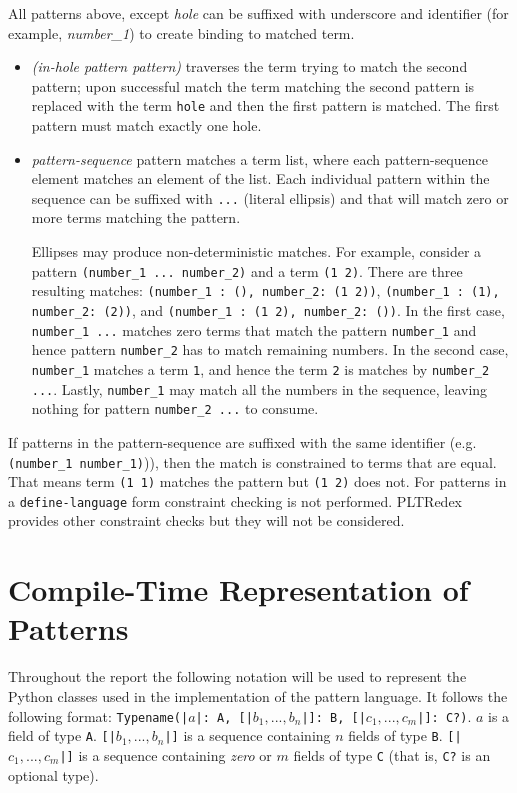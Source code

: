 All patterns above, except \textit{hole} can be suffixed with underscore and identifier (for example, \textit{number\_1}) to create binding to matched term.

\begin{itemize}
\item
\textit{(in-hole pattern pattern)} traverses the term trying to match the second pattern; upon successful match the term matching the second pattern is replaced with the term \texttt{hole} and then the first pattern is matched. The first pattern must match exactly one hole.

\item
\textit{pattern-sequence} pattern matches a term list, where each pattern-sequence element matches an element of the list. Each individual pattern within the sequence can be suffixed with \texttt{...} (literal ellipsis) and that will match zero or more terms matching the pattern.

Ellipses may produce non-deterministic matches. For example, consider a pattern \texttt{(number\_1 ... number\_2)} and a term \texttt{(1 2)}. There are three resulting matches: \texttt{(number\_1 : (), number\_2: (1 2))}, \texttt{(number\_1 : (1), number\_2: (2))}, and \texttt{(number\_1 : (1 2), number\_2: ())}. In the first case, \texttt{number\_1 ...} matches zero terms that match the pattern \texttt{number\_1} and hence pattern \texttt{number\_2} has to match remaining numbers. In the second case, \texttt{number\_1} matches a term \texttt{1}, and hence the term \texttt{2} is matches by \texttt{number\_2 ...}. Lastly, \texttt{number\_1} may match all the numbers in the sequence, leaving nothing for pattern \texttt{number\_2 ...} to consume.
\end{itemize}

If patterns in the pattern-sequence are suffixed with the same identifier (e.g. \texttt{(number\_1 number\_1)})), then the match is constrained to terms that are equal. That means term \texttt{(1 1)} matches the pattern but \texttt{(1 2)} does not. For patterns in a \texttt{define-language} form constraint checking is not performed. PLTRedex provides other constraint checks but they will not be considered.

\section{Compile-Time Representation of Patterns}

Throughout the report the following notation will be used to represent the Python classes used in the implementation of the pattern language. It follows the following format: \texttt{Typename(|$a$|: A, [|$b_1,...,b_n$|]: B, [|$c_1,...,c_m$|]: C?)}. $a$ is a field of type \texttt{A}. \texttt{[|$b_1,...,b_n$|]} is a sequence containing $n$ fields of type \texttt{B}. \texttt{[|$c_1,...,c_m$|]} is a sequence containing \textit{zero} or $m$ fields of type \texttt{C} (that is, \texttt{C?} is an optional type).

